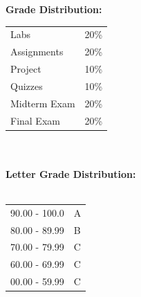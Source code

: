 \documentclass[11pt]{article}
\begin{document}
\textbf {\large Grade Distribution:} \\
\hspace*{40mm}
\begin{tabular}{ l l }
    Labs & 20\% \\
    Assignments & 20\% \\
    Project & 10\% \\
    Quizzes  & 10\% \\
    Midterm Exam  & 20\% \\
    Final Exam  & 20\%
\end{tabular} \\\\

\textbf {\large Letter Grade Distribution:} \\\\
\hspace*{40mm}
\begin{tabular}{ l l }
    90.00 - 100.0 & A \\
    80.00 - 89.99 & B \\
    70.00 - 79.99 & C \\
    60.00 - 69.99 & C \\
    00.00 - 59.99 & C \\
\end{tabular} \\
\end{document}
